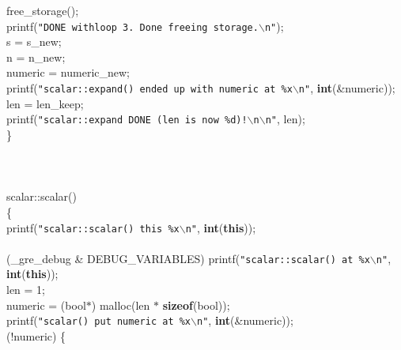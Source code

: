 \begin{flushleft}
\hspace*{4\indentation}free\_storage();\mbox{}\\
\hspace*{4\indentation}printf({\tt"DONE withloop   3.  Done freeing storage.$\backslash$n"});\mbox{}\\
\hspace*{4\indentation}s = s\_new;\mbox{}\\
\hspace*{4\indentation}n = n\_new;\mbox{}\\
\hspace*{4\indentation}numeric = numeric\_new;\mbox{}\\
\hspace*{4\indentation}printf({\tt"scalar::expand() ended up with numeric at \%x$\backslash$n"}, {\bf int}(\&numeric));\mbox{}\\
\hspace*{4\indentation}len = len\_keep;\mbox{}\\
\hspace*{4\indentation}printf({\tt"scalar::expand  DONE (len is now \%d)!$\backslash$n$\backslash$n"}, len);\mbox{}\\
\}\mbox{}\\
\mbox{}\\
\mbox{}\\
\mbox{}\\
scalar::scalar()  \mbox{}\\
\{ \mbox{}\\
\hspace*{4\indentation}printf({\tt"scalar::scalar() this \%x$\backslash$n"}, {\bf int}({\bf this}));\mbox{}\\
\mbox{}\\
\hspace*{4\indentation}{\bf if} (\_gre\_debug \& DEBUG\_VARIABLES) printf({\tt"scalar::scalar() at \%x$\backslash$n"}, {\bf int}({\bf this}));\mbox{}\\
\hspace*{4\indentation}len = 1;\mbox{}\\
\hspace*{4\indentation}numeric = (bool$\ast$) malloc(len $\ast$ {\bf sizeof}(bool));\mbox{}\\
\hspace*{4\indentation}printf({\tt"scalar() put numeric at \%x$\backslash$n"}, {\bf int}(\&numeric));\mbox{}\\
\hspace*{4\indentation}{\bf if} (!numeric) \{\mbox{}\\

\end{flushleft}
